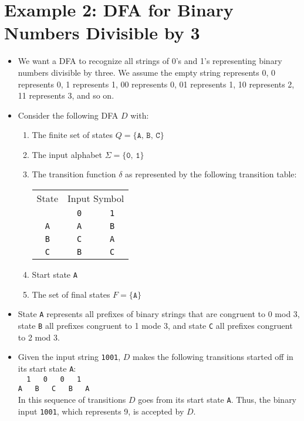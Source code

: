 \documentclass[]{article}
\begin{document}
\section{Example 2: DFA for Binary Numbers Divisible by 3}
  \begin{itemize}
    \item We want a DFA to recognize all strings of 0's and 1's representing
    binary numbers divisible by three. We assume the empty string represents
    0, 0 represents 0, 1 represents 1, 00 represents 0, 01 represents 1, 10
    represents 2, 11 represents 3, and so on.
    \item Consider the following DFA $D$ with:
      \begin{enumerate}
        \item The finite set of states $Q = \{ \texttt{A, B, C} \}$
        \item The input alphabet $\Sigma = \{ \texttt{0, 1} \}$
        \item The transition function $\delta$ as represented by the following
        transition table:

          \begin{tabular}{|c|c|c|}
            \hline
            State & \multicolumn{2}{|c|}{Input Symbol} \\ \cline{2-3}
                  & \texttt{0} & \texttt{1} \\ \hline
            \texttt{A} & \texttt{A} & \texttt{B} \\ \hline
            \texttt{B} & \texttt{C} & \texttt{A} \\ \hline
            \texttt{C} & \texttt{B} & \texttt{C} \\ \hline
          \end{tabular}
        \item Start state \texttt{A}
        \item The set of final states $F = \{ \texttt{A} \}$
      \end{enumerate}
    \item State \texttt{A} represents all prefixes of binary strings that are
    congruent to 0 mod 3, state \texttt{B} all prefixes congruent to 1 mode 3,
    and state \texttt{C} all prefixes congruent to 2 mod 3.
    \item Given the input string \texttt{1001}, $D$ makes the following
    transitions started off in its start state \texttt{A}:\\
    \verb|  1   0   0   1   | \\
    \verb|A   B   C   B   A | \\
    In this sequence of transitions $D$ goes from its start state \texttt{A}.
    Thus, the binary input \texttt{1001}, which represents 9, is accepted by
    $D$.
  \end{itemize}
\end{document}
